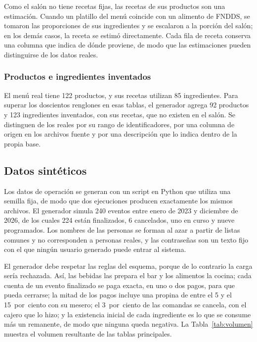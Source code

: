 Como el salón no tiene recetas fijas, las recetas de sus productos son una estimación. Cuando un platillo del menú coincide con un alimento de FNDDS, se tomaron las proporciones de sus ingredientes y se escalaron a la porción del salón; en los demás casos, la receta se estimó directamente. Cada fila de receta conserva una columna que indica de dónde proviene, de modo que las estimaciones pueden distinguirse de los datos reales.

\subsubsection{Productos e ingredientes inventados}

El menú real tiene 122 productos, y sus recetas utilizan 85 ingredientes. Para superar los doscientos renglones en esas tablas, el generador agrega 92 productos y 123 ingredientes inventados, con sus recetas, que no existen en el salón. Se distinguen de los reales por su rango de identificadores, por una columna de origen en los archivos fuente y por una descripción que lo indica dentro de la propia base.

\subsection{Datos sintéticos}

Los datos de operación se generan con un script en Python que utiliza una semilla fija, de modo que dos ejecuciones producen exactamente los mismos archivos. El generador simula 240 eventos entre enero de 2023 y diciembre de 2026, de los cuales 224 están finalizados, 6 cancelados, uno en curso y nueve programados. Los nombres de las personas se forman al azar a partir de listas comunes y no corresponden a personas reales, y las contraseñas son un texto fijo con el que ningún usuario generado puede entrar al sistema.

El generador debe respetar las reglas del esquema, porque de lo contrario la carga sería rechazada. Así, las bebidas las prepara el bar y los alimentos la cocina; cada cuenta de un evento finalizado se paga exacta, en uno o dos pagos, para que pueda cerrarse; la mitad de los pagos incluye una propina de entre el 5 y el 15~por~ciento con su mesero; el 3~por~ciento de las comandas se cancela, con el cajero que lo hizo; y la existencia inicial de cada ingrediente es lo que se consume más un remanente, de modo que ninguna queda negativa. La Tabla~\ref{tab:volumen} muestra el volumen resultante de las tablas principales.

